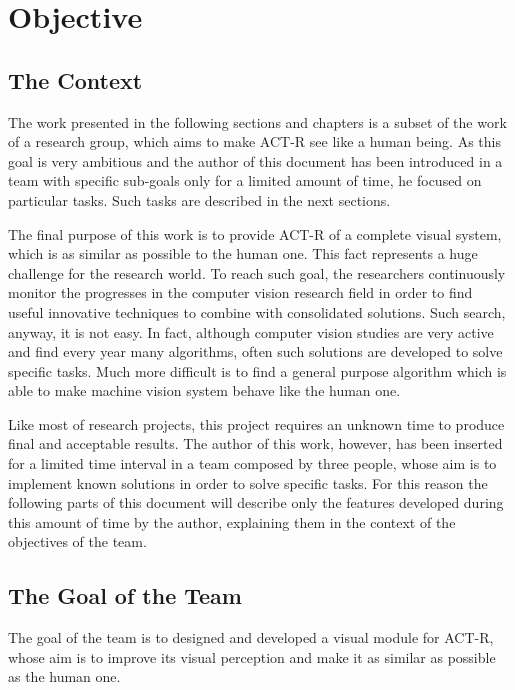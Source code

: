 \chapter{Objective}\label{chObjective}

	\section{The Context}
	The work presented in the following sections and chapters is a subset of the work of a research group, which aims to make \mbox{ACT-R} see like a human being. As this goal is very ambitious and the author of this document has been introduced in a team with specific sub-goals only for a limited amount of time, he focused on particular tasks. Such tasks are described in the next sections.

	The final purpose of this work is to provide \mbox{ACT-R} of a complete visual system, which is as similar as possible to the human one. This fact represents a huge challenge for the research world. To reach such goal, the researchers continuously monitor the progresses in the computer vision research field in order to find useful innovative techniques to combine with consolidated solutions. 
	Such search, anyway, it is not easy. In fact, although computer vision studies are very active and find every year many algorithms, often such solutions are developed to solve specific tasks. Much more difficult is to find a general purpose algorithm which is able to make machine vision system behave like the human one.

	Like most of research projects, this project requires an unknown time to produce final and acceptable results.
	The author of this work, however, has been inserted for a limited time interval in a team composed by three people, whose aim is to implement known solutions in order to solve specific tasks. 
	For this reason the following parts of this document will describe only the features developed during this amount of time by the author, explaining them in the context of the objectives of the team. 
	
	\section{The Goal of the Team}
	The goal of the team is to designed and developed a visual module for \mbox{ACT-R}, whose aim is to improve its visual perception and make it as similar as possible as the human one. 

